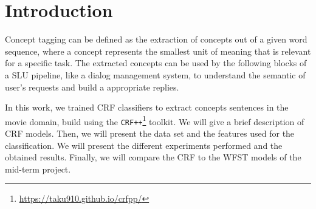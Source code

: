 \section{Introduction}
\label{sec:introduction}

Concept tagging can be defined as the extraction of concepts out of a given word sequence,
where a concept represents the smallest unit of meaning that is relevant for a specific task.
The extracted concepts can be used by the following blocks of a \ac{SLU} pipeline, like a dialog management system, to understand the semantic of user's requests and build a appropriate replies.

In this work, we trained \ac{CRF} classifiers to extract concepts sentences in the movie domain, build using
the \texttt{CRF++}\footnote{\url{https://taku910.github.io/crfpp/}} toolkit.
We will give a brief description of \ac{CRF} models.
Then, we will present the data set and the features used for the classification.
We will present the different experiments performed and the obtained results.
Finally, we will compare the \ac{CRF} to the \ac{WFST} models of the mid-term project.
